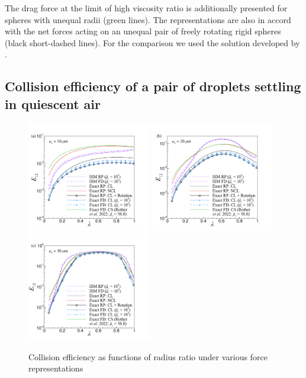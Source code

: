 \documentclass[../thesis.tex]{subfiles}
\begin{document}
The drag force at the limit of high viscosity ratio is additionally presented for spheres with unequal radii (green lines). The representations are also in accord with the net forces acting on an unequal pair of freely rotating rigid spheres (black short-dashed lines). For the comparison we used the solution developed by \cite{Z80}.


\subsection{Collision efficiency of a pair of droplets settling in quiescent air}
\begin{figure}%
\center
{\includegraphics[trim=05mm 05mm 20mm 15mm, clip, width=0.48\textwidth]{../figs/PRF/fig7a.pdf}
 \includegraphics[trim=05mm 05mm 20mm 15mm, clip, width=0.48\textwidth]{../figs/PRF/fig7b.pdf}}
 \includegraphics[trim=00mm 05mm 25mm 15mm, clip, width=0.48\textwidth]{../figs/PRF/fig7c.pdf}
\caption{Collision efficiency as functions of radius ratio under various force representations}
\label{fig:E12}
\end{figure}%
\end{document}
